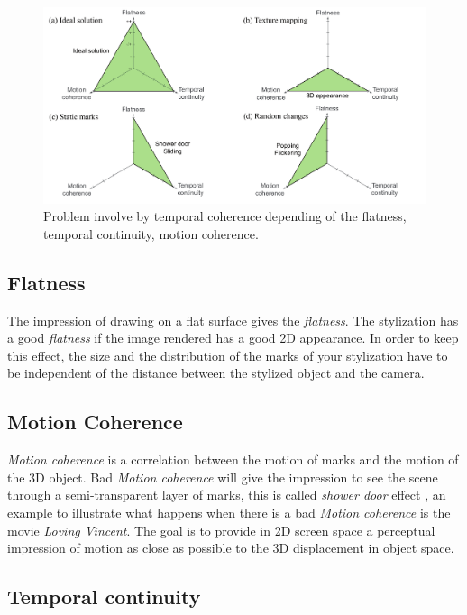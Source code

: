 \begin{figure}
    \begin{center}
    \includegraphics[scale=0.3]{pics/temporal_coherence.png}
    \end{center}
    \caption{Problem involve by temporal coherence depending of the flatness, temporal continuity, motion coherence.}
    \label{problem_temporal_coherence}
\end{figure}

\subsection{Flatness}

The impression of drawing on a flat surface gives the \textit{flatness}. The stylization has a good \textit{flatness} if the image rendered has a good 2D appearance. In order to keep this effect, the size and the distribution of the marks of your stylization have to be independent of the distance between the stylized object and the camera.

\subsection{Motion Coherence}

\textit{Motion coherence} is a correlation between the motion of marks and the motion of the 3D object. Bad \textit{Motion coherence} will give the impression to see the scene through a semi-transparent layer of marks, this is called \textit{shower door} effect \cite{meier_painterly_1996}, an example to illustrate what happens when there is a bad \textit{Motion coherence} is the movie \textit{Loving Vincent}\cite{LovingVincent}. The goal is to provide in 2D screen space a perceptual impression of motion as
close as possible to the 3D displacement in object space.

\subsection{Temporal continuity}

